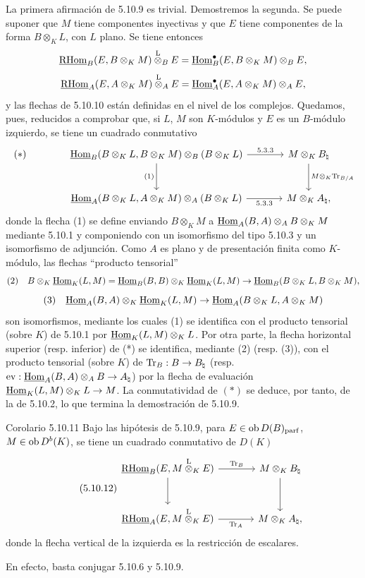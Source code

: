 La primera afirmación de 5.10.9 es trivial. Demostremos la segunda. Se puede suponer que $M$ tiene componentes inyectivas y que $E$ tiene componentes de la forma $B\otimes_KL$, con $L$ plano. Se tiene entonces
\[
\underline{\mathrm{RHom}}_B(E,B\otimes_KM)\overset{\mathrm L}{\otimes}_BE=\underline{\operatorname{Hom}}_B^\bullet(E,B\otimes_KM)\otimes_BE,
\]
\[
\underline{\mathrm{RHom}}_A(E,A\otimes_KM)\overset{\mathrm L}{\otimes}_AE=\underline{\operatorname{Hom}}_A^\bullet(E,A\otimes_KM)\otimes_AE,
\]
y las flechas de 5.10.10 están definidas en el nivel de los complejos. Quedamos, pues, reducidos a comprobar que, si $L$, $M$ son $K$-módulos y $E$ es un $B$-módulo izquierdo, se tiene un cuadrado conmutativo
\[
\begin{tikzcd}[column sep=large,row sep=large]
|[alias=star]| {(*)} & \uHom_B(B\otimes_KL,B\otimes_KM)\otimes_B(B\otimes_KL) \arrow[r,"5.3.3"] \arrow[d,"(1)"'] & M\otimes_KB_\natural \arrow[d,"M\otimes_K\Tr_{B/A}"]\\
& \uHom_A(B\otimes_KL,A\otimes_KM)\otimes_A(B\otimes_KL) \arrow[r,"5.3.3"'] & M\otimes_KA_\natural,
\end{tikzcd}
\]
donde la flecha (1) se define enviando $B\otimes_KM$ a $\underline{\operatorname{Hom}}_A(B,A)\otimes_AB\otimes_KM$ mediante 5.10.1 y componiendo con un isomorfismo del tipo 5.10.3 y un isomorfismo de adjunción. Como $A$ es plano y de presentación finita como $K$-módulo, las flechas ``producto tensorial''
\[
\text{(2)}\quad B\otimes_K\underline{\operatorname{Hom}}_K(L,M)=\underline{\operatorname{Hom}}_B(B,B)\otimes_K\underline{\operatorname{Hom}}_K(L,M)\to\underline{\operatorname{Hom}}_B(B\otimes_KL,B\otimes_KM),
\]
\[
\text{(3)}\quad \underline{\operatorname{Hom}}_A(B,A)\otimes_K\underline{\operatorname{Hom}}_K(L,M)\to\underline{\operatorname{Hom}}_A(B\otimes_KL,A\otimes_KM)
\]
son isomorfismos, mediante los cuales (1) se identifica con el producto tensorial (sobre $K$) de 5.10.1 por $\underline{\operatorname{Hom}}_K(L,M)\otimes_KL$. Por otra parte, la flecha horizontal superior (resp. inferior) de (*) se identifica, mediante (2) (resp. (3)), con el producto tensorial (sobre $K$) de $\operatorname{Tr}_B:B\to B_\natural$ (resp. $\mathrm{ev}:\underline{\operatorname{Hom}}_A(B,A)\otimes_AB\to A_\natural$) por la flecha de evaluación $\underline{\operatorname{Hom}}_K(L,M)\otimes_KL\to M$. La conmutatividad de $(*)$ se deduce, por tanto, de la de 5.10.2, lo que termina la demostración de 5.10.9.

\begin{statement}{Corolario 5.10.11}
Bajo las hipótesis de 5.10.9, para $E\in\operatorname{ob} D(B)_{\mathrm{parf}}$, $M\in\operatorname{ob} D^b(K)$, se tiene un cuadrado conmutativo de $D(K)$
\begin{equation}\tag{5.10.12}
\begin{tikzcd}[column sep=large,row sep=large]
\uRHom_B(E,M\lten_KE) \arrow[r,"\Tr_B"] \arrow[d] & M\otimes_KB_\natural \arrow[d]\\
\uRHom_A(E,M\lten_KE) \arrow[r,"\Tr_A"'] & M\otimes_KA_\natural,
\end{tikzcd}
\end{equation}
donde la flecha vertical de la izquierda es la restricción de escalares.
\end{statement}

En efecto, basta conjugar 5.10.6 y 5.10.9.
